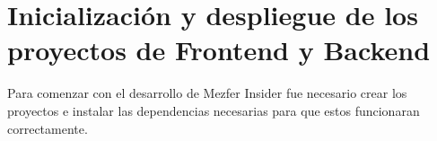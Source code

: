 \section{Inicialización y despliegue de los proyectos de Frontend y Backend}
Para comenzar con el desarrollo de Mezfer Insider fue necesario crear los proyectos e instalar las dependencias necesarias para que estos funcionaran correctamente.
    
    
    
    